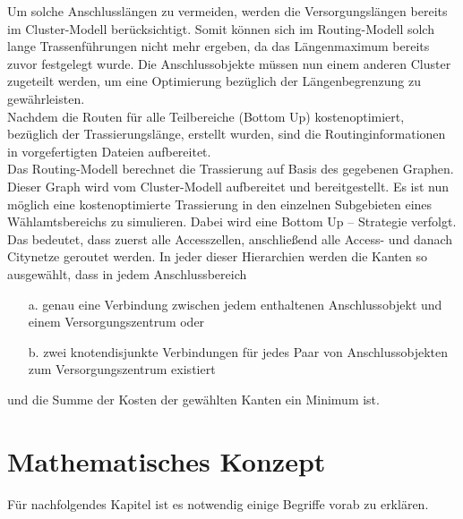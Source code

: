  \vspace{0.5cm}
 
\par Um solche Anschlusslängen zu vermeiden, werden die Versorgungslängen bereits im Cluster-Modell berücksichtigt. Somit können sich im Routing-Modell
solch lange Trassenführungen nicht mehr ergeben, da das Längenmaximum bereits zuvor festgelegt wurde. Die Anschlussobjekte müssen nun einem anderen 
Cluster zugeteilt werden, um eine Optimierung bezüglich der Längenbegrenzung zu gewährleisten.\\
Nachdem die Routen für alle Teilbereiche (Bottom Up) kostenoptimiert, bezüglich der Trassierungslänge, erstellt wurden, sind die
Routinginformationen in vorgefertigten Dateien aufbereitet.\\
Das Routing-Modell berechnet die Trassierung auf Basis des gegebenen Graphen. Dieser Graph wird vom Cluster-Modell aufbereitet und bereitgestellt. 
Es ist nun möglich eine kostenoptimierte Trassierung in den einzelnen Subgebieten eines Wählamtsbereichs zu simulieren. 
Dabei wird eine Bottom Up – Strategie verfolgt. Das bedeutet, dass zuerst alle Accesszellen, anschließend alle Access- und danach Citynetze 
geroutet werden.
In jeder dieser Hierarchien werden die Kanten so ausgewählt, dass in jedem Anschlussbereich

\begin{enumerate}
		\item[a.] genau eine Verbindung zwischen jedem enthaltenen Anschlussobjekt und einem Versorgungszentrum oder 
		\item[b.] zwei knotendisjunkte Verbindungen für jedes Paar von Anschlussobjekten zum Versorgungszentrum existiert
\end{enumerate}

und die Summe der Kosten der gewählten Kanten ein Minimum ist.		



 
\vspace{1cm}

\section{Mathematisches Konzept}
\label{sec:2methoden}


\vspace{0.5cm}

Für nachfolgendes Kapitel ist es notwendig einige Begriffe vorab zu erklären.

